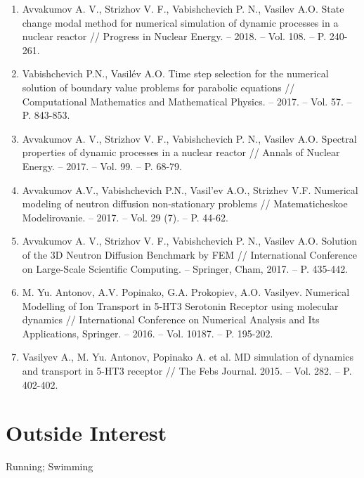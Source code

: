 \documentclass[a4paper]{article}
\def\footerlink{}
\renewenvironment{itemize}{
  \begin{list}{}{
    \setlength{\leftmargin}{1.5em}
  }
}{
  \end{list}
}
\begin{document}
\begin{enumerate}
\item Avvakumov A. V., Strizhov V. F., Vabishchevich P. N., Vasilev A.O. State change modal method for numerical simulation of dynamic processes in a nuclear reactor // Progress in Nuclear Energy. -- 2018. -- Vol. 108. -- P. 240-261.

\item Vabishchevich P.N., Vasil\' ev A.O. Time step selection for the numerical solution of boundary value problems for parabolic equations // Computational Mathematics and Mathematical Physics. -- 2017. -- Vol. 57. -- P. 843-853.

\item Avvakumov A. V., Strizhov V. F., Vabishchevich P. N., Vasilev A.O. Spectral properties of dynamic processes in a nuclear reactor // Annals of Nuclear Energy. -- 2017.  -- Vol. 99.  -- P. 68-79.

\item Avvakumov A.V., Vabishchevich P.N., Vasil'ev A.O., Strizhev V.F. Numerical modeling of neutron diffusion non-stationary problems // Matematicheskoe Modelirovanie. --  2017. --  Vol. 29 (7). -- P. 44-62.

\item Avvakumov A. V., Strizhov V. F., Vabishchevich P. N., Vasilev A.O. Solution of the 3D Neutron Diffusion Benchmark by FEM // International Conference on Large-Scale Scientific Computing. -- Springer, Cham, 2017. -- P. 435-442.

\item M. Yu. Antonov, A.V. Popinako, G.A. Prokopiev, A.O. Vasilyev.  Numerical Modelling of Ion Transport in 5-HT3 Serotonin Receptor using molecular dynamics // International Conference on Numerical Analysis and Its Applications, Springer. -- 2016. -- Vol. 10187. -- P. 195-202.

\item Vasilyev A., M. Yu. Antonov, Popinako A. et al. MD simulation of dynamics and transport in 5-HT3 receptor // The Febs Journal. 2015. -- Vol. 282. -- P. 402-402.

\end{enumerate}

\section*{Outside Interest}
\begin{itemize}
\item Running; Swimming
\end{itemize}


\bigskip

\end{document}
